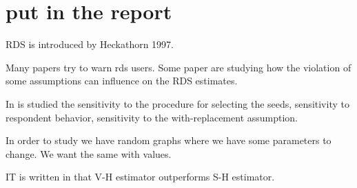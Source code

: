 \documentclass[12pt]{report}
\begin{document}
\section{put in the report}

RDS is introduced by Heckathorn 1997.

Many papers try to warn rds users.
Some paper are studying how the violation of some assumptions can influence on the RDS estimates.

In \cite{gile2010respondent} is studied  the sensitivity to the procedure for selecting the seeds, sensitivity to respondent behavior, sensitivity to the with-replacement assumption.

In order to study we have random graphs where we have some parameters to change. We want the same with values.



IT is written in \cite{gile2010respondent} that V-H estimator outperforms S-H estimator.
\end{document}

